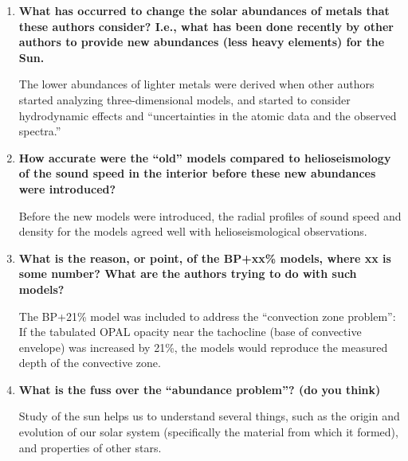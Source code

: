 \documentclass[11pt]{article}
\begin{document}
\begin{enumerate}
    \item \textbf{What has occurred to change the solar abundances
        of metals that these authors consider?
        I.e., what has been done recently by other
        authors to provide new abundances (less heavy elements) for the Sun.}

        The lower abundances of lighter metals were derived when other
        authors started analyzing three-dimensional models,
        and started to consider hydrodynamic effects and
        ``uncertainties in the atomic data and the observed spectra.''

    \item \textbf{How accurate were the ``old'' models compared to helioseismology
        of the sound speed in the interior before these new abundances were
        introduced?}

        Before the new models were introduced, the radial profiles of sound
        speed and density for the models agreed well with helioseismological
        observations.

    \item \textbf{What is the reason, or point, of the BP+xx\% models,
        where xx is some number? What are the authors trying to do
        with such models?}

        The BP+21\% model was included to address the ``convection zone
        problem'': If the tabulated OPAL opacity near the tachocline
        (base of convective envelope) was increased by 21\%, the models
        would reproduce the measured depth of the convective zone.

    \item \textbf{What is the fuss over the ``abundance problem''? (do you think)}

        Study of the sun helps us to understand several things, such as
        the origin and evolution of our solar system (specifically the
        material from which it formed), and properties of other stars.

\end{enumerate}
\end{document}
